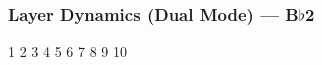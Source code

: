 \subsubsection[Layer Dynamics (Dual Mode)]{Layer Dynamics (Dual Mode) --- \UiKey{\SET}B$\flat$2}










































1
2
3
4
5
6
7
8
9
10
